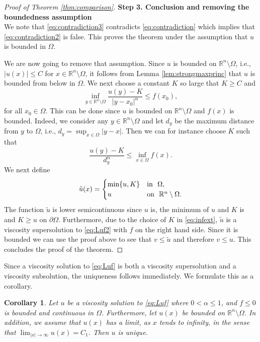 \documentclass[11pt]{article}
\providecommand{\Rn}{\mathbb{R}^n}
\newtheorem{cor}[thm]{Corollary}
\numberwithin{equation}{section}
\theoremstyle{definition}
\begin{document}
\begin{proof}[Proof of Theorem \ref{thm:comparison}]
\textbf{Step 3. Conclusion and removing the boundedness assumption}\\
We note that \eqref{eq:contradiction3} contradicts \eqref{eq:contradiction} which implies that \eqref{eq:contradiction2} is false. This proves the theorem under the assumption that $u$ is bounded in $\Omega$. 

We are now going to remove that assumption. Since $u$ is bounded on $\Rn \setminus \Omega$, i.e., $|u(x)|\leq C$ for $x \in \Rn \setminus \Omega$, it follows from Lemma \ref{lem:strongmaxprinc} that $u$ is bounded from below in $\Omega$. We next choose a constant $K$ so large that $K \geq C$ and 
\begin{equation}\label{eq:infext}
  \inf_{y \in \Rn \setminus \Omega} \frac{u(y)-K}{|y-x_0|^{\alpha}} \leq f(x_0),  
\end{equation}
for all $x_0 \in \Omega$. This can be done since $u$ is bounded on $\Rn \setminus \Omega$ and $f(x)$ is bounded. Indeed, we consider any $y \in \Rn \setminus \Omega$ and let $d_y$ be the maximum distance from $y$ to $\Omega$, i.e., $d_y = \sup_{x \in \Omega} |y-x|$. Then we can for instance choose $K$ such that
$$
\frac{u(y)-K}{d^{\alpha}_y} \leq \inf_{x \in \Omega} f(x).
$$
We next define
\begin{align*}
   \tilde{u}(x) =   \begin{cases}
                    \textup{min}\{u, K\} & \textup{in  } \ \Omega, \\
                    u    & \textup{on  } \ \Rn \setminus \Omega.
     \end{cases}
\end{align*}
The function $\tilde{u}$ is lower semicontinuous since $u$ is, the minimum of $u$ and $K$ is and $K \geq u$ on $\partial \Omega$. Furthermore, due to the choice of $K$ in \eqref{eq:infext}, $\tilde{u}$ is a viscosity supersolution to \eqref{eq:Luf2} with $f$ on the right hand side. Since it is bounded we can use the proof above to see that $v \leq \tilde{u}$ and therefore $v \leq u$. This concludes the proof of the theorem.
\end{proof}

Since a viscosity solution to \eqref{eq:Luf} is both a viscosity supersolution and a viscosity subsolution, the uniqueness follows immediately. We formulate this as a corollary.

\begin{cor}
    Let $u$ be a viscosity solution to \eqref{eq:Luf} where $0 < \alpha \leq 1$, and $f \leq 0$ is bounded and continuous in $\Omega$. Furthermore, let $u(x)$ be bounded on $ \Rn \setminus \Omega$. In addition, we assume that $u(x)$ has a limit, as $x$ tends to infinity, in the sense that $\lim_{|x| \to \infty} u(x) = C_1$. Then $u$ is unique.
\end{cor}
\end{document}
